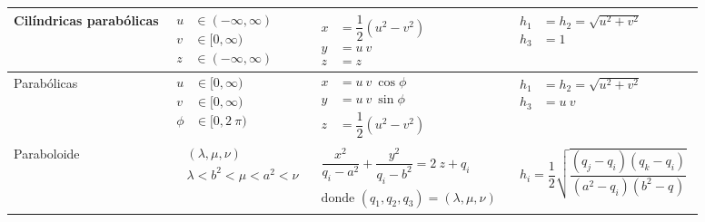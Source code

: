 \documentclass[12pt,landscape]{article}
\numberwithin{equation}{section}
\begin{document}
{\begin{longtable}{| l | p{5cm} | l | p{7.3cm} |}
Cilíndricas parabólicas & $\!\begin{aligned}
u &\in (-\infty,\infty) \\
v &\in [0,\infty) \\
z &\in(-\infty,\infty)
\end{aligned}$ & $\!\begin{aligned}
 x &= \dfrac{1}{2}(u^{2 } -v^{2})\\
y &= u \: v \\
z &=z
\end{aligned}$ & $\!\begin{aligned}
h_{1 } &= h_{2} = \sqrt{u^{2 } +v^{2}} \\
h_{3 } &= 1
\end{aligned}$ \\ \hline

Parabólicas & $\!\begin{aligned}
u &\in [0, \infty) \\
v &\in [0, \infty) \\
\phi &\in [0, 2 \: \pi)
\end{aligned}$ & $\!\begin{aligned}
x &= u \: v \: \cos \phi \\
y &= u \: v \: \sin \phi \\
z &= \dfrac{1}{2} (u^{2} - v^{2})
\end{aligned}$ & $\!\begin{aligned}
h_{1} &= h_{2} = \sqrt{u^{2 } +v^{2}} \\
h_{3} &= u \: v
\end{aligned}$ \\ \hline

Paraboloide & $\!\begin{aligned}
& (\lambda, \mu, \nu) \\
& \lambda < b^{2} < \mu < a^{2} < \nu
\end{aligned}$ & $\!\begin{aligned}
\dfrac{x^{2}}{q_{i} - a^{2}} + \dfrac{y^{2}}{q_{i} - b^{2}} = 2 \: z + q_{i} \\[1em]
\mbox{donde } (q_{1}, q_{2}, q_{3})=(\lambda, \mu, \nu)
\end{aligned}$ & $\!\begin{aligned}
h_{i} = \dfrac{1}{2} \sqrt{\dfrac{(q_{j} - q_{i})(q_{k} - q_{i})}{(a^{2} - q_{i})(b^{2} - q_{ })}}
\end{aligned}$ \\\hline


\end{longtable}}
\end{document}
